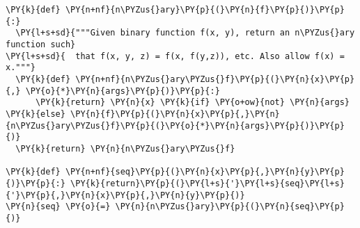 \begin{Verbatim}[commandchars=\\\{\}]
\PY{k}{def} \PY{n+nf}{n\PYZus{}ary}\PY{p}{(}\PY{n}{f}\PY{p}{)}\PY{p}{:}
  \PY{l+s+sd}{"""Given binary function f(x, y), return an n\PYZus{}ary function such}
\PY{l+s+sd}{  that f(x, y, z) = f(x, f(y,z)), etc. Also allow f(x) = x."""}
  \PY{k}{def} \PY{n+nf}{n\PYZus{}ary\PYZus{}f}\PY{p}{(}\PY{n}{x}\PY{p}{,} \PY{o}{*}\PY{n}{args}\PY{p}{)}\PY{p}{:}
      \PY{k}{return} \PY{n}{x} \PY{k}{if} \PY{o+ow}{not} \PY{n}{args} \PY{k}{else} \PY{n}{f}\PY{p}{(}\PY{n}{x}\PY{p}{,}\PY{n}{n\PYZus{}ary\PYZus{}f}\PY{p}{(}\PY{o}{*}\PY{n}{args}\PY{p}{)}\PY{p}{)}
  \PY{k}{return} \PY{n}{n\PYZus{}ary\PYZus{}f}

\PY{k}{def} \PY{n+nf}{seq}\PY{p}{(}\PY{n}{x}\PY{p}{,}\PY{n}{y}\PY{p}{)}\PY{p}{:} \PY{k}{return}\PY{p}{(}\PY{l+s}{'}\PY{l+s}{seq}\PY{l+s}{'}\PY{p}{,}\PY{n}{x}\PY{p}{,}\PY{n}{y}\PY{p}{)}
\PY{n}{seq} \PY{o}{=} \PY{n}{n\PYZus{}ary}\PY{p}{(}\PY{n}{seq}\PY{p}{)}
\end{Verbatim}
